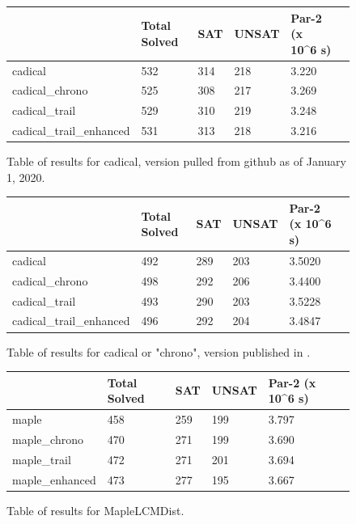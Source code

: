 \documentclass[runningheads]{llncs}
\begin{document}
\begin{figure}
    \begin{tabular}{|l|l|l|l|l|l|}
      \hline
      & Total Solved & SAT & UNSAT & Par-2 (x 10\textasciicircum{}6 s) \\ \hline
      cadical                  & 532          & 314 &  218  & 3.220                             \\ \hline
      cadical\_chrono          & 525          & 308 &  217  & 3.269                             \\ \hline
      cadical\_trail           & 529          & 310 &  219  & 3.248                             \\ \hline
      cadical\_trail\_enhanced & 531          & 313 &  218  & 3.216                             \\ \hline
    \end{tabular}
    \caption{Table of results for cadical, version pulled from github as of January 1, 2020.}
\end{figure}

\begin{figure}
    \begin{tabular}{|l|l|l|l|l|l|}
      \hline
      & Total Solved & SAT & UNSAT & Par-2 (x 10\textasciicircum{}6 s) \\ \hline
      cadical                  & 492          & 289 &  203  & 3.5020                            \\ \hline
      cadical\_chrono          & 498          & 292 &  206  & 3.4400                            \\ \hline
      cadical\_trail           & 493          & 290 &  203  & 3.5228                            \\ \hline
      cadical\_trail\_enhanced & 496          & 292 &  204  & 3.4847                            \\ \hline
    \end{tabular}
    \caption{Table of results for cadical or "chrono", version published in \cite{DBLP:conf/sat/MohleB19}.}
\end{figure}

\begin{figure}
    \begin{tabular}{|l|l|l|l|l|l|}
      \hline
      & Total Solved & SAT & UNSAT & Par-2 (x 10\textasciicircum{}6 s) \\ \hline
      maple           & 458          & 259 &  199  & 3.797                             \\ \hline
      maple\_chrono   & 470          & 271 &  199  & 3.690                             \\ \hline
      maple\_trail    & 472          & 271 &  201  & 3.694                             \\ \hline
      maple\_enhanced & 473          & 277 &  195  & 3.667                             \\ \hline
    \end{tabular}
    \caption{Table of results for MapleLCMDist.}
\end{figure}
\clearpage
\end{document}
